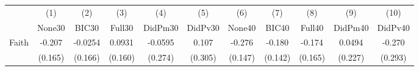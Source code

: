 {
\def\sym#1{\ifmmode^{#1}\else\(^{#1}\)\fi}
\begin{tabular}{l*{10}{c}}
\toprule
            &\multicolumn{1}{c}{(1)}&\multicolumn{1}{c}{(2)}&\multicolumn{1}{c}{(3)}&\multicolumn{1}{c}{(4)}&\multicolumn{1}{c}{(5)}&\multicolumn{1}{c}{(6)}&\multicolumn{1}{c}{(7)}&\multicolumn{1}{c}{(8)}&\multicolumn{1}{c}{(9)}&\multicolumn{1}{c}{(10)}\\
            &\multicolumn{1}{c}{None30}&\multicolumn{1}{c}{BIC30}&\multicolumn{1}{c}{Full30}&\multicolumn{1}{c}{DidPm30}&\multicolumn{1}{c}{DidPv30}&\multicolumn{1}{c}{None40}&\multicolumn{1}{c}{BIC40}&\multicolumn{1}{c}{Full40}&\multicolumn{1}{c}{DidPm40}&\multicolumn{1}{c}{DidPv40}\\
\midrule
Faith       &      -0.207         &     -0.0254         &      0.0931         &     -0.0595         &       0.107         &      -0.276         &      -0.180         &      -0.174         &      0.0494         &      -0.270         \\
            &     (0.165)         &     (0.166)         &     (0.160)         &     (0.274)         &     (0.305)         &     (0.147)         &     (0.142)         &     (0.165)         &     (0.227)         &     (0.293)         \\
\bottomrule
\end{tabular}
}
